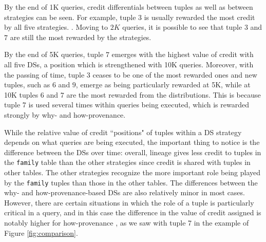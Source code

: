 
By the end of 1K queries, credit differentials between tuples as well as between strategies can be seen.  For example, tuple 3 is usually rewarded the most credit by all five strategies. 
.
Moving to $2K$ queries, it is possible to see that tuple $3$ and $7$ are still the most rewarded by the strategies.

By the end of 5K queries, tuple $7$ emerges with the highest value of credit with all five DSs, a position which is strengthened with 10K queries. Moreover, with the passing of time, tuple $3$ ceases to be one of the most rewarded ones and new tuples, such as $6$ and $9$, emerge as being particularly rewarded at 5K, while at 10K tuples $6$ and $7$ are the most rewarded from the distributions.
This is because tuple $7$ is used several times within queries being executed, which is rewarded strongly by why- and how-provenance.


While the relative value of credit ``positions" of tuples within a DS strategy depends on what queries are being executed, the important thing to notice is the difference between the DSs over time:  overall, lineage gives less credit to tuples in the \texttt{family} table than the other strategies since credit is shared with tuples in other tables.
The other strategies recognize the more important role being played by the \texttt{family} tuples than those in the other tables.
The differences between the why- and how-provenance-based DSs are also relatively minor in most cases. However, there are certain situations in which the role of a tuple is particularly critical in a query, and in this case the difference in the value of credit assigned is notably higher for how-provenance , as we saw with tuple 7 in the example of Figure \ref{fig:comparison}. 



